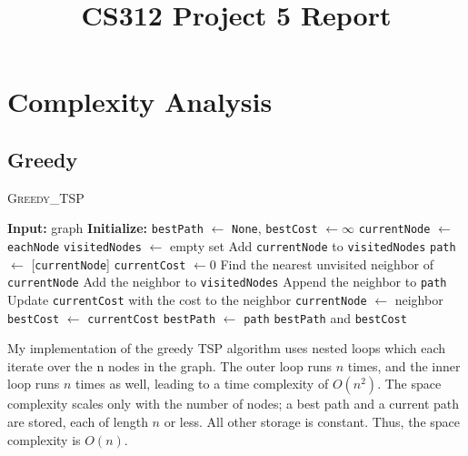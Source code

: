 \documentclass[12pt]{article}
\title{CS312 Project 5 Report}
\author{}
\date{}
\begin{document}
\maketitle

\tableofcontents

\section{Complexity Analysis}

\subsection{Greedy}
\begin{algorithm}[H]
    \caption{\textsc{Greedy\_TSP}}
    \begin{algorithmic}[1]
        \State \textbf{Input:} graph
        \State \textbf{Initialize:} \texttt{bestPath} $\gets$ \texttt{None}, \texttt{bestCost} $\gets \infty$
         
            \State \texttt{currentNode} $\gets$ \texttt{eachNode}
            \State \texttt{visitedNodes} $\gets$ empty set
            \State Add \texttt{currentNode} to \texttt{visitedNodes}
            \State \texttt{path} $\gets$ [\texttt{currentNode}]
            \State \texttt{currentCost} $\gets 0$
             
                \State Find the nearest unvisited neighbor of \texttt{currentNode}
                \State Add the neighbor to \texttt{visitedNodes}
                \State Append the neighbor to \texttt{path}
                \State Update \texttt{currentCost} with the cost to the neighbor
                \State \texttt{currentNode} $\gets$ neighbor
            \EndWhile
                \State \texttt{bestCost} $\gets$ \texttt{currentCost}
                \State \texttt{bestPath} $\gets$ \texttt{path}
            \EndIf
        \EndFor
        \State \Return \texttt{bestPath} and \texttt{bestCost}
    \end{algorithmic}
\end{algorithm}

My implementation of the greedy TSP algorithm uses nested loops which each iterate
over the n nodes in the graph. The outer loop runs $n$ times, and the inner loop
runs $n$ times as well, leading to a time complexity of $O(n^2)$. The space complexity
scales only with the number of nodes; a best path and a current path are stored, each of
length $n$ or less. All other storage is constant. Thus, the space complexity is $O(n)$.
\end{document}
